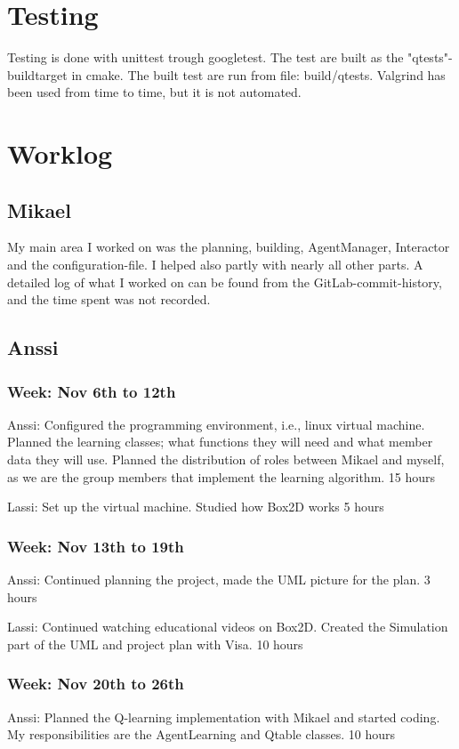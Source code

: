 \documentclass{article}
\begin{document}
\section{Testing}
Testing is done with unittest trough googletest.
The test are built as the "qtests"-buildtarget in cmake.
The built test are run from file: build/qtests.
Valgrind has been used from time to time, but it is not automated.


\section{Worklog}

\subsection{Mikael}
My main area I worked on was the planning, building, AgentManager,
Interactor and the configuration-file. I helped also partly with nearly all
other parts.
A detailed log of what I worked on can be found from the GitLab-commit-history,
and the time spent was not recorded.

\subsection{Anssi}
\subsubsection{Week: Nov 6th to 12th}
Anssi:
Configured the programming environment, i.e., linux virtual machine.
Planned the learning classes; what functions they will need and what
member data they will use. Planned the distribution of roles between
Mikael and myself, as we are the group members that implement the learning
algorithm.
15 hours

Lassi:
Set up the virtual machine. Studied how Box2D works
5 hours

\subsubsection{Week: Nov 13th to 19th}
Anssi:
Continued planning the project, made the UML picture for the plan.
3 hours

Lassi:
Continued watching educational videos on Box2D. Created the Simulation 
part of the UML and project plan with Visa. 
10 hours

\subsubsection{Week: Nov 20th to 26th}
Anssi:
Planned the Q-learning implementation with Mikael and started coding.
My responsibilities are the AgentLearning and Qtable classes.
10 hours
\end{document}
